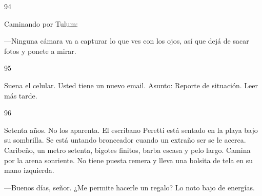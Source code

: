 \documentclass[12pt,twoside,openright,a5paper]{book}
\begin{document}
\vspace{0.5cm}
\afterpage{}
\hrulefill \hspace{0.1cm}\decofourleft\hspace{0.2cm} 94 \hspace{0.2cm}\decofourright \hspace{0.1cm}\hrulefill

\nopagebreak

\vspace{0.5cm}

\nopagebreak

Caminando por Tulum:

---Ninguna cámara va a capturar lo que ves con los ojos,
así que dejá de sacar fotos y ponete a mirar.

\vspace{0.5cm}

\hrulefill \hspace{0.1cm}\decofourleft\hspace{0.2cm} 95 \hspace{0.2cm}\decofourright \hspace{0.1cm}\hrulefill

\nopagebreak

\vspace{0.5cm}

\nopagebreak

Suena el celular. Usted tiene un nuevo email. Asunto: Reporte de situación. Leer más tarde.


\vspace{0.5cm}

\hrulefill \hspace{0.1cm}\decofourleft\hspace{0.2cm} 96 \hspace{0.2cm}\decofourright \hspace{0.1cm}\hrulefill

\nopagebreak

\vspace{0.5cm}

\nopagebreak

Setenta años. No los aparenta. El escribano Peretti está sentado en la
playa bajo  su sombrilla. Se está untando bronceador cuando un extraño ser
se le acerca.  Caribeño, un metro setenta, bigotes finitos, barba escasa
y pelo largo. Camina por la arena sonriente. No
tiene puesta remera y lleva una bolsita de tela en su mano izquierda.

---Buenos días, señor. ¿Me permite hacerle un regalo? Lo noto bajo de
energías.
\end{document}
